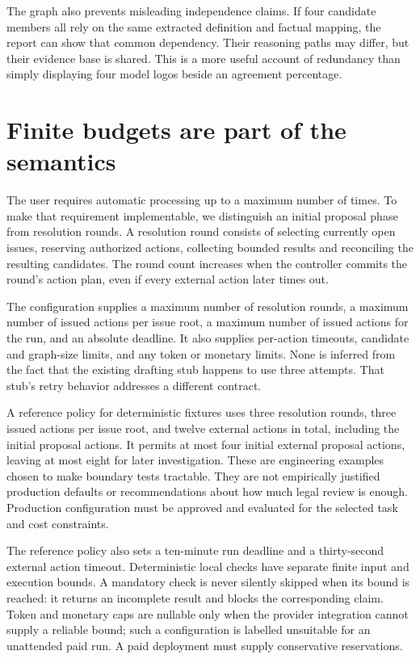 The graph also prevents misleading independence claims. If four candidate members
all rely on the same extracted definition and factual mapping, the report can
show that common dependency. Their reasoning paths may differ, but their evidence
base is shared. This is a more useful account of redundancy than simply displaying
four model logos beside an agreement percentage.

\section{Finite budgets are part of the semantics}

The user requires automatic processing up to a maximum number of times. To make
that requirement implementable, we distinguish an initial proposal phase from
resolution rounds. A resolution round consists of selecting currently open
issues, reserving authorized actions, collecting bounded results and reconciling
the resulting candidates. The round count increases when the controller commits
the round's action plan, even if every external action later times out.

The configuration supplies a maximum number of resolution rounds, a maximum
number of issued actions per issue root, a maximum number of issued actions for
the run, and an absolute deadline. It also supplies per-action timeouts, candidate
and graph-size limits, and any token or monetary limits. None is inferred from
the fact that the existing drafting stub happens to use three attempts. That
stub's retry behavior addresses a different contract.

A reference policy for deterministic fixtures uses three resolution rounds,
three issued actions per issue root, and twelve external actions in total,
including the initial proposal actions. It permits at most four initial external
proposal actions, leaving at most eight for later investigation. These are
engineering examples chosen to make boundary tests tractable. They are not
empirically justified production defaults or recommendations about how much
legal review is enough. Production configuration must be approved and evaluated
for the selected task and cost constraints.

The reference policy also sets a ten-minute run deadline and a thirty-second
external action timeout. Deterministic local checks have separate finite input
and execution bounds. A mandatory check is never silently skipped when its bound
is reached: it returns an incomplete result and blocks the corresponding claim.
Token and monetary caps are nullable only when the provider integration cannot
supply a reliable bound; such a configuration is labelled unsuitable for an
unattended paid run. A paid deployment must supply conservative reservations.

